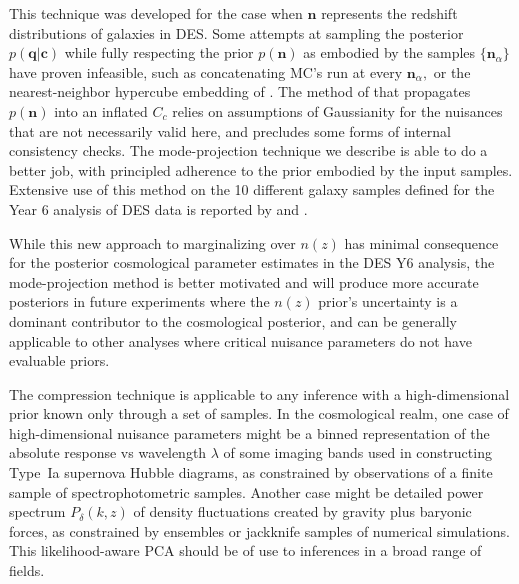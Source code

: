 \documentclass[onecolumn,resetfootnote]{aastex7}
\newcommand{\vecc}{\ensuremath{\mathbf{c}}}
\newcommand{\vecq}{\ensuremath{\mathbf{q}}}
\newcommand{\vecn}{\ensuremath{\mathbf{n}}}
\newcommand{\covm}{C}
\begin{document}
This technique was developed for the case when
  $\vecn$ represents the redshift distributions of galaxies in DES.  Some
  attempts at sampling the posterior $p(\vecq| \vecc)$ while fully respecting
  the prior $p(\vecn)$ as embodied by the samples $\{\vecn_\alpha\}$ have
  proven infeasible, such as concatenating MC's run at every $\vecn_\alpha,$ or the
  nearest-neighbor hypercube embedding of \citet{hyperrank}.  The method of
  \citet{bridle02} that propagates $p(\vecn)$ into an inflated $\covm_c$ relies on
  assumptions of Gaussianity for the nuisances that are not necessarily valid
  here, and precludes some forms of internal consistency checks.
  The mode-projection technique we describe is
  able to do a better job, with
  principled adherence to the prior embodied by
  the input samples.
  Extensive
  use of this method on the 10 different galaxy samples defined for the Year 6
  analysis of DES data is reported by \citet{y6pz, y6maglim} and \citet{y6wz}.

While this new approach to marginalizing over $n(z)$  has minimal consequence for the
  posterior cosmological parameter estimates in the DES Y6 analysis,
  the mode-projection method is better motivated and will produce more
  accurate posteriors in future experiments where the $n(z)$
  prior's uncertainty is a dominant contributor to the cosmological posterior,
  and can be generally applicable to other analyses where critical nuisance parameters
  do not have evaluable priors.

The compression technique is applicable to any inference with a
  high-dimensional prior known only through a set of samples.  In the
  cosmological realm, one case of high-dimensional nuisance
  parameters might  be a binned representation of the absolute response vs
  wavelength $\lambda$ of some imaging bands used in
  constructing Type~Ia supernova Hubble diagrams, as constrained by observations
  of a finite sample of spectrophotometric samples.  Another case might be
  detailed power spectrum $P_\delta(k,z)$ of density fluctuations created by
  gravity plus baryonic forces, as constrained by ensembles or jackknife samples
  of numerical simulations.  This likelihood-aware PCA should be of use to
  inferences in a broad range of fields.
  
\end{document}
